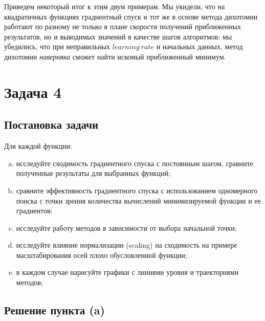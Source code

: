 \documentclass[12pt, a4paper, oneside, final]{article}
\begin{document}
	Приведем некоторый итог к этим двум примерам. Мы увидели, что на квадратичных функциях градиентный спуск и тот же в основе метода дихотомии работают по разному не только в плане скорости получений приближенных результатов, но и выводимых значений в качестве шагов алгоритмов: мы убедились, что при неправильных $learning~rate$ и начальных данных, метод дихотомии \textit{наверняка} сможет найти искомый приближенный минимум.
	\newpage
	\section*{Задача 4}
	\subsection*{Постановка задачи}
	Для каждой функции:
	\begin{enumerate}[(a)]
		\item исследуйте сходимость градиентного спуска с постоянным шагом, сравните полученные результаты для выбранных функций;
		\item сравните эффективность градиентного спуска с использованием одномерного поиска с точки зрения количества вычислений минимизируемой функции и ее градиентов;
		\item исследуйте работу методов в зависимости от выбора начальной точки;
		\item исследуйте влияние нормализации (scaling) на сходимость на примере масштабирования осей плохо обусловленной функции;
		\item в каждом случае нарисуйте графики с линиями уровня и траекториями методов;
	\end{enumerate}
	\subsection*{Решение пункта (a)}
\end{document}
